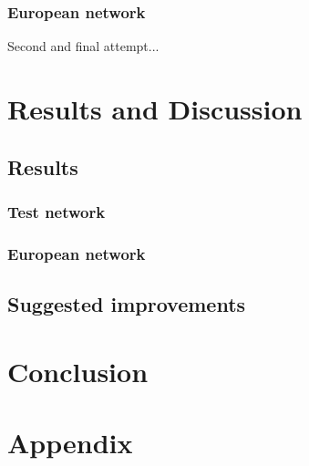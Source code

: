 \documentclass[a4paper,10pt]{report}
\begin{document}
\subsection{European network}
Second and final attempt...













\chapter{Results and Discussion}
\section{Results}
\subsection{Test network}
\subsection{European network}
\section{Suggested improvements}


\chapter{Conclusion}
\chapter*{Appendix}
\end{document}
